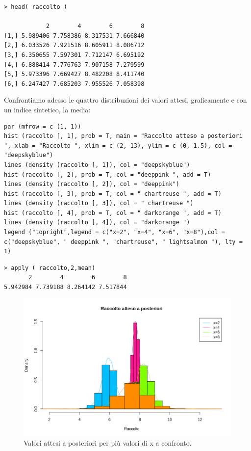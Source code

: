 {
\color{red}
\begin{Verbatim}
> head( raccolto )

            2        4        6        8
[1,] 5.989406 7.758386 8.317531 7.666840
[2,] 6.033526 7.921516 8.605911 8.086712
[3,] 6.350655 7.597301 7.712147 6.695192
[4,] 6.888414 7.776763 7.907158 7.279599
[5,] 5.973396 7.669427 8.482208 8.411740
[6,] 6.247427 7.685203 7.955526 7.058398
\end{Verbatim}
}
Confrontiamo adesso le quattro distribuzioni dei valori attesi,
graficamente e con un indice sintetico, la media:
\begin{lstlisting}[style=R]
par (mfrow = c (1, 1))
hist (raccolto [, 1], prob = T, main = "Raccolto atteso a posteriori ", xlab = "Raccolto ", xlim = c (2, 13), ylim = c (0, 1.5), col = "deepskyblue")
lines (density (raccolto [, 1]), col = "deepskyblue")
hist (raccolto [, 2], prob = T, col = "deeppink ", add = T)
lines (density (raccolto [, 2]), col = "deeppink")
hist (raccolto [, 3], prob = T, col = " chartreuse ", add = T)
lines (density (raccolto [, 3]), col = " chartreuse ")
hist (raccolto [, 4], prob = T, col = " darkorange ", add = T)
lines (density (raccolto [, 4]), col = "darkorange ")
legend ("topright",legend = c("x=2", "x=4", "x=6", "x=8"),col = c("deepskyblue", " deeppink ", "chartreuse", " lightsalmon "), lty = 1)
\end{lstlisting}

{
\color{red}
\begin{Verbatim}
> apply ( raccolto,2,mean)
       2        4        6        8
5.942984 7.739188 8.264142 7.517844
\end{Verbatim}
}

\begin{figure}
    \centering
    \includegraphics[totalheight=8cm]{img/esercizio11-2-5.png}
    \caption{  Valori attesi a posteriori per più valori di x a confronto.}
\end{figure}

